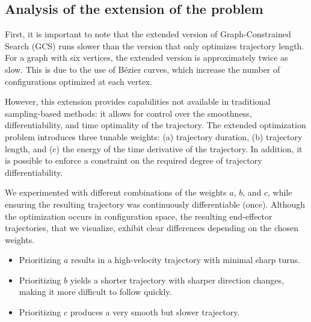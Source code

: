 \subsection{Analysis of the extension of the problem}
First, it is important to note that the extended version of Graph-Constrained Search (GCS) runs slower than the version that only optimizes trajectory length. For a graph with six vertices, the extended version is approximately twice as slow. This is due to the use of Bézier curves, which increase the number of configurations optimized at each vertex.

However, this extension provides capabilities not available in traditional sampling-based methods: it allows for control over the smoothness, differentiability, and time optimality of the trajectory. The extended optimization problem introduces three tunable weights: (a) trajectory duration, (b) trajectory length, and (c) the energy of the time derivative of the trajectory. In addition, it is possible to enforce a constraint on the required degree of trajectory differentiability.

We experimented with different combinations of the weights \( a \), \( b \), and \( c \), while ensuring the resulting trajectory was continuously differentiable (once). Although the optimization occurs in configuration space, the resulting end-effector trajectories, that we visualize, exhibit clear differences depending on the chosen weights.

\begin{itemize}
    \item Prioritizing \( a \) results in a high-velocity trajectory with minimal sharp turns.
    \item Prioritizing \( b \) yields a shorter trajectory with sharper direction changes, making it more difficult to follow quickly.
    \item Prioritizing \( c \) produces a very smooth but slower trajectory.
\end{itemize}

